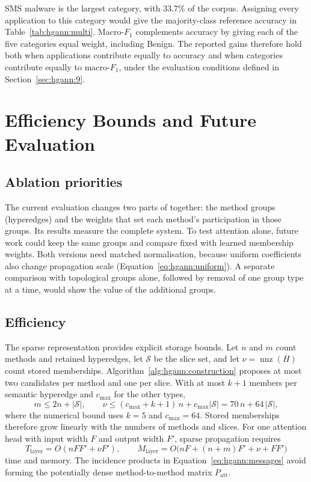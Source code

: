 SMS malware is the largest category, with 33.7\% of the corpus. Assigning every application
to this category would give the majority-class reference accuracy in
Table~\ref{tab:hgann:multi}. Macro-$F_1$ complements accuracy by giving each of the five
categories equal weight, including Benign. The reported gains therefore hold both when
applications contribute equally to accuracy and when categories contribute equally to
macro-$F_1$, under the evaluation conditions defined in Section~\ref{sec:hgann:9}.

\section{Efficiency Bounds and Future Evaluation}
\label{sec:hgann:13}

\subsection*{Ablation priorities}

The current evaluation changes two parts of \hgann{} together: the method groups
(hyperedges) and the weights that set each method's participation in those groups. Its
results measure the complete system. To test attention alone, future work could keep the
same groups and compare fixed with learned membership weights. Both versions need matched
normalisation, because uniform coefficients also change propagation scale
(Equation~\ref{eq:hgann:uniform}). A separate comparison with topological groups alone,
followed by removal of one group type at a time, would show the value of the additional groups.

\subsection*{Efficiency}

The sparse representation provides explicit storage bounds. Let $n$ and $m$ count methods and
retained hyperedges, let $\mathcal{S}$ be the slice set, and let
$\nu=\operatorname{nnz}(H)$ count stored memberships.
Algorithm~\ref{alg:hgann:construction} proposes at most two candidates per method and one per
slice. With at most $k+1$ members per semantic hyperedge and $c_{\max}$ for the other types,
\begin{equation}
  m \le 2n + \lvert \mathcal{S} \rvert , \qquad
  \nu \le (c_{\max} + k + 1)\, n + c_{\max} \lvert \mathcal{S} \rvert
  = 70\, n + 64\, \lvert \mathcal{S} \rvert ,
  \label{eq:hgann:sizes}
\end{equation}
where the numerical bound uses $k=5$ and $c_{\max}=64$. Stored memberships therefore grow
linearly with the numbers of methods and slices. For one attention head with input width $F$
and output width $F'$, sparse propagation requires
\begin{equation}
  T_{\text{layer}} = O(nFF' + \nu F') , \qquad
  M_{\text{layer}} = O\bigl(nF + (n + m)F' + \nu + FF'\bigr)
  \label{eq:hgann:cost}
\end{equation}
time and memory. The incidence products in Equation~\ref{eq:hgann:messages} avoid forming
the potentially dense method-to-method matrix $P_{\text{att}}$.

